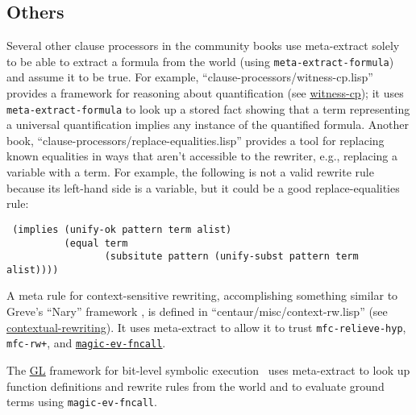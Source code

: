 \subsection{Others}

Several other clause processors in the community books use
meta-extract solely to be able to extract a formula from the world
(using \texttt{meta-extract-formula}) and assume it to be true.  For
example, ``clause-processors/witness-cp.lisp'' provides a framework
for reasoning about quantification (see
\href{http://www.cs.utexas.edu/users/moore/acl2/manuals/current/manual/index.html?topic=ACL2\_\_\_\_WITNESS-CP}{\underline{witness-cp}}); it uses
\texttt{meta-extract-formula} to look up a stored fact showing that a
term representing a universal quantification implies any instance
of the quantified formula.  Another book,
``clause-processors/replace-equalities.lisp'' provides a tool for
replacing known equalities in ways that aren't accessible to the
rewriter, e.g., replacing a variable with a term.  For example, the
following is not a valid rewrite rule because its left-hand side is a variable,
but it could be a good replace-equalities rule:
\begin{verbatim}
 (implies (unify-ok pattern term alist)
          (equal term
                 (subsitute pattern (unify-subst pattern term alist))))
\end{verbatim}

\begin{comment}
Above, ``subsitute'' looks like a typo.  Probably you meant
``substitute'', but probably, you really meant
``substitute-into-term''.  When I read this I thought it said
``substitute'', and I thought it was weird to use a generic sort of
list utility to create a term.  So I looked at
clause-processors/replace-equalities.lisp and found
substitute-into-term.  Maybe the reader could do that too, but I very
slightly prefer just using substitute-into-term.  You get to decide --
but of course something needs to be done about the typo,
``subsitute''.
\end{comment}

A meta rule for context-sensitive rewriting, accomplishing something
similar to Greve's ``Nary'' framework \cite{greve06}, is defined in
``centaur/misc/context-rw.lisp'' (see
\href{http://www.cs.utexas.edu/users/moore/acl2/manuals/current/manual/index.html?topic=ACL2\_\_\_\_CONTEXTUAL-REWRITING}{\underline{contextual-rewriting}}).
It uses meta-extract to allow it to
trust \texttt{mfc-relieve-hyp}, \texttt{mfc-rw+}, and
\href{http://www.cs.utexas.edu/users/moore/acl2/manuals/current/manual/index.html?topic=ACL2\_\_\_\_MAGIC-EV-FNCALL}{\underline{\tt magic-ev-fncall}}.

The
\href{http://www.cs.utexas.edu/users/moore/acl2/manuals/current/manual/index.html?topic=ACL2\_\_\_\_GL}{\underline{GL}}
framework for bit-level symbolic execution~\cite{gl-diss,
  bit-blasting-GL} uses meta-extract to look up function definitions
and rewrite rules from the world and to evaluate ground terms using
\texttt{magic-ev-fncall}.
